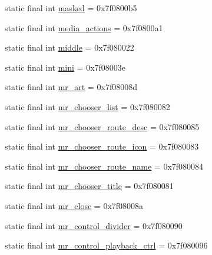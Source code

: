 \begin{CompactItemize}
\item 
static final int \hyperlink{classandroid_1_1support_1_1graphics_1_1drawable_1_1_r_1_1id_1bb1d2a10b89d3cc6a72bbbb7b764ebf}{masked} = 0x7f0800b5
\item 
static final int \hyperlink{classandroid_1_1support_1_1graphics_1_1drawable_1_1_r_1_1id_ba021c0e2a2d8cd39afd2cc7e592e7c2}{media\_\-actions} = 0x7f0800a1
\item 
static final int \hyperlink{classandroid_1_1support_1_1graphics_1_1drawable_1_1_r_1_1id_d2113897f693cc1fa9da5dbb0dd930e1}{middle} = 0x7f080022
\item 
static final int \hyperlink{classandroid_1_1support_1_1graphics_1_1drawable_1_1_r_1_1id_acc255597917e148e344940b41f5b6bb}{mini} = 0x7f08003e
\item 
static final int \hyperlink{classandroid_1_1support_1_1graphics_1_1drawable_1_1_r_1_1id_bcf93eabfad774f2d0e220797aeea197}{mr\_\-art} = 0x7f08008d
\item 
static final int \hyperlink{classandroid_1_1support_1_1graphics_1_1drawable_1_1_r_1_1id_a8e63cbbaee82394a01c6e5e1d1e2e9f}{mr\_\-chooser\_\-list} = 0x7f080082
\item 
static final int \hyperlink{classandroid_1_1support_1_1graphics_1_1drawable_1_1_r_1_1id_4b93ebc2b2ca8e0f68d27c1d5a7a5061}{mr\_\-chooser\_\-route\_\-desc} = 0x7f080085
\item 
static final int \hyperlink{classandroid_1_1support_1_1graphics_1_1drawable_1_1_r_1_1id_7c4d4d6d1f259f12f24e240e93432154}{mr\_\-chooser\_\-route\_\-icon} = 0x7f080083
\item 
static final int \hyperlink{classandroid_1_1support_1_1graphics_1_1drawable_1_1_r_1_1id_27522e01fe36ca316fa95717ee7dc844}{mr\_\-chooser\_\-route\_\-name} = 0x7f080084
\item 
static final int \hyperlink{classandroid_1_1support_1_1graphics_1_1drawable_1_1_r_1_1id_6193146f303200bee8ef3a48e5b3e6f0}{mr\_\-chooser\_\-title} = 0x7f080081
\item 
static final int \hyperlink{classandroid_1_1support_1_1graphics_1_1drawable_1_1_r_1_1id_7bb210352be2820c1367cc18059eb00f}{mr\_\-close} = 0x7f08008a
\item 
static final int \hyperlink{classandroid_1_1support_1_1graphics_1_1drawable_1_1_r_1_1id_c5670a00cd5edd2c272d9a683955b20a}{mr\_\-control\_\-divider} = 0x7f080090
\item 
static final int \hyperlink{classandroid_1_1support_1_1graphics_1_1drawable_1_1_r_1_1id_4cd1831b7b50726dd268e6553701ac28}{mr\_\-control\_\-playback\_\-ctrl} = 0x7f080096

\end{CompactItemize}

